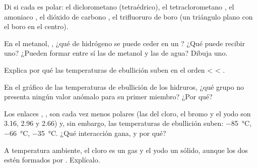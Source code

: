 \begin{exercise}[$\star\star$]\label{exo:g11:polarity-and-cohesion:6}
Di si cada  es polar: el diclorometano 
(tetraédrico), el tetraclorometano , el amoniaco , el
dióxido de carbono , el trifluoruro de boro  (un
triángulo plano con el boro en el centro).
\end{exercise}

\begin{exercise}[$\star\star$]\label{exo:g11:polarity-and-cohesion:7}
En el metanol, , ¿qué  de hidrógeno se puede ceder en un
? ¿Qué  puede recibir uno? ¿Pueden formar
 entre sí las  de metanol y las de agua?
Dibuja uno.
\end{exercise}

\begin{exercise}[$\star\star$]\label{exo:g11:polarity-and-cohesion:8}
Explica por qué las temperaturas de ebullición suben en el orden
 <
 < .
\end{exercise}

\begin{exercise}[$\star\star$]\label{exo:g11:polarity-and-cohesion:9}
En el gráfico de las temperaturas de ebullición de los hidruros, ¿qué
grupo no presenta ningún valor anómalo para su primer miembro? ¿Por qué?
\end{exercise}

\begin{exercise}[$\star\star$]\label{exo:g11:polarity-and-cohesion:10}
Los enlaces , ,  son cada vez menos polares
(las  del cloro, el bromo y el yodo son 3.16, 2.96 y
2.66) y, sin embargo, las temperaturas de ebullición suben:
\qty{-85}{\celsius}, \qty{-66}{\celsius}, \qty{-35}{\celsius}. ¿Qué
interacción gana, y por qué?
\end{exercise}

\begin{exercise}[$\star\star$]\label{exo:g11:polarity-and-cohesion:11}
A temperatura ambiente, el cloro es un gas y el yodo un sólido, aunque
los dos estén formados por  . Explícalo.
\end{exercise}

